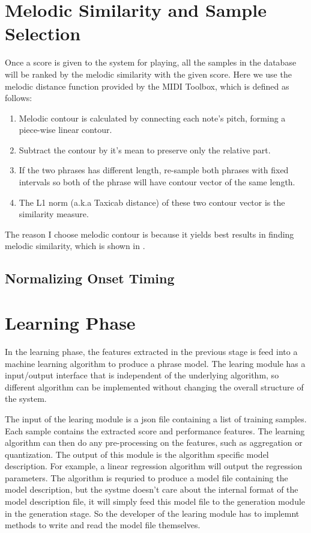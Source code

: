    \section{Melodic Similarity and Sample Selection}
   Once a score is given to the system for playing, all the samples in the database will be ranked by the melodic similarity with the given score. Here we use the melodic distance function provided by the MIDI Toolbox\cite{Eerola2004}, which is defined as follows: 
   \begin{enumerate}
      \item Melodic contour is calculated by connecting each note's pitch, forming a piece-wise linear contour.
      \item Subtract the contour by it's mean to preserve only the relative part.
      \item If the two phrases has different length, re-sample both phrases with fixed intervals so both of the phrase will have contour vector of the same length.
      \item The L1 norm (a.k.a Taxicab distance) of these two contour vector is the similarity measure. 
   \end{enumerate}
   The reason I choose melodic contour is because it yields best results in finding melodic similarity, which is shown in \cite{Hoffmann-engl2005}.

   \subsection{Normalizing Onset Timing}
   \section{Learning Phase}
   In the learning phase, the features extracted in the previous stage is feed into a machine learning algorithm to produce a phrase model. The learing module has a input/output interface that is independent of the underlying algorithm, so different algorithm can be implemented without changing the overall structure of the system.

   The input of the learing module is a json file containing a list of training samples. Each sample contains the extracted score and performance features. The learning algorithm can then do any pre-processing on the features, such as aggregation or quantization. The output of this module is the algorithm specific model description. For example, a linear regression algorithm will output the regression parameters. The algorithm is requried to produce a model file containing the model description, but the systme doesn't care about the internal format of the model description file, it will simply feed this model file to the generation module in the generation stage. So the developer of the learing module has to implemnt methods to write and read the model file themselves.

